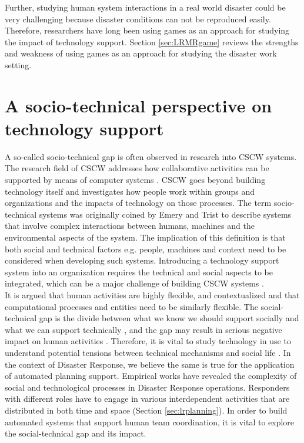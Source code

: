 Further, studying human system interactions in a real world disaster could be very challenging because disaster conditions can not be reproduced easily. Therefore, researchers have long been using games as an approach for studying the impact of technology support.  Section \ref{sec:LRMRgame} reviews the strengths and weakness of using games as an approach for studying the disaster work setting. \\


\section{A socio-technical perspective on technology support} \label{sec:LRSocialTechnical}

A so-called socio-technical gap is often observed in research into \acf{CSCW} systems. The research field of \ac{CSCW} addresses how collaborative activities can be supported by means of computer systems \citep{Carstensen1999}.  \ac{CSCW} goes beyond building technology itself and investigates how people work within groups and organizations and the impacts of technology on those processes. The term socio-technical systems was originally coined by Emery and Trist \citep{Ropohl1999} to describe systems that involve complex interactions between humans, machines and the environmental aspects of the system. The implication of this definition is that both social and technical factors e.g. people, machines and context need to be considered when developing such systems. Introducing a technology support system into an organization requires the technical and social aspects to be integrated, which can be a major challenge of building \ac{CSCW} systems \citep{Ackerman2000}. \\

It is argued \citep{Ackerman2000} that human activities are highly flexible, and contextualized and that computational processes and entities need to be similarly flexible. The social-technical gap is the divide between what we know we should support socially and what we can support technically \citep{Ackerman2000}, and the gap may result in serious negative impact on human activities \citep{Bowers1994,Abbott1994a}. Therefore, it is vital to study technology in use to understand potential tensions between technical mechanisms and social life \citep{Bowers1994}.  In the context of Disaster Response, we believe the same is true for the application of automated planning support. Empirical works \citep{Kopena2008,Fischer2015,Zerger2003} have revealed the complexity of social and technological processes in Disaster Response operations. Responders with different roles have to engage in various interdependent activities that are distributed in both time and space (Section \ref{sec:lrplanning}). In order to build automated systems that support human team coordination, it is vital to explore the social-technical gap and its impact. \\ 

